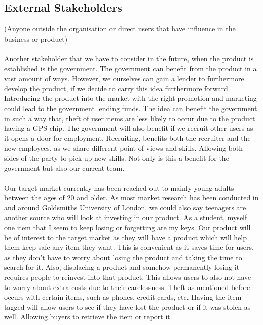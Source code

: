 \documentclass[12pt,a4paper]{article}
\begin{document}
\begin{appendices}
        \subsection{External Stakeholders}
           (Anyone outside the organisation or direct users that have influence in the business or product)
        \paragraph{}
          Another stakeholder that we have to consider in the future, when the product is established is the government. The government can benefit from the product in a vast amount of ways. However, we ourselves can gain a lender to furthermore develop the product, if we decide to carry this idea furthermore forward. Introducing the product into the market with the right promotion and marketing could lead to the government lending funds. The idea can benefit the government in such a way that, theft of user items are less likely to occur due to the product having a GPS chip. The government will also benefit if we recruit other users as it opens a door for employment. Recruiting, benefits both the recruiter and the new employees, as we share different point of views and skills. Allowing both sides of the party to pick up new skills. Not only is this a benefit for the government but also our current team.
        \paragraph{}
          Our target market currently has been reached out to mainly young adults between the ages of 20 and older. As most market research has been conducted in and around Goldsmiths University of London, we could also say teenagers are another source who will look at investing in our product. As a student, myself one item that I seem to keep losing or forgetting are my keys. Our product will be of interest to the target market as they will have a product which will help them keep safe any item they want. This is convenient as it saves time for users, as they don't have to worry about losing the product and taking the time to search for it. Also, displacing a product and somehow permanently losing it requires people to reinvest into that product. This allows users to also not have to worry about extra costs due to their carelessness. Theft as mentioned before occurs with certain items, such as phones, credit cards, etc. Having the item tagged will allow users to see if they have lost the product or if it was stolen as well. Allowing buyers to retrieve the item or report it.      
    

\end{appendices}
\end{document}
